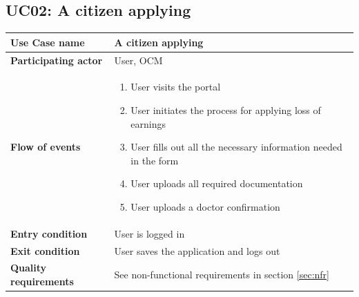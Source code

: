 \documentclass{article}
\begin{document}
\subsection{UC02: A citizen applying}

\begin{table}[htb!]
\begin{tabularx}{\textwidth}{l|X}
	\textbf{Use Case name} & A citizen applying \\
	\hline
	\textbf{Participating actor} & User, OCM\\
	\hline
	\textbf{Flow of events} & 
	\begin{minipage}{\linewidth}
	    \begin{enumerate}
	        \item User visits the portal
	        \item User initiates the process for applying loss of earnings
	        \item User fills out all the necessary information needed in the form
	        \item User uploads all required documentation
	        \item User uploads a doctor confirmation
	    \end{enumerate}
	\end{minipage}\\
	\hline
	\textbf{Entry condition} & User is logged in\\
	\hline
	\textbf{Exit condition} & User saves the application and logs out\\
	\hline
	\textbf{Quality requirements} & See non-functional requirements in section \ref{sec:nfr}\\
\end{tabularx}
\end{table}
\end{document}
